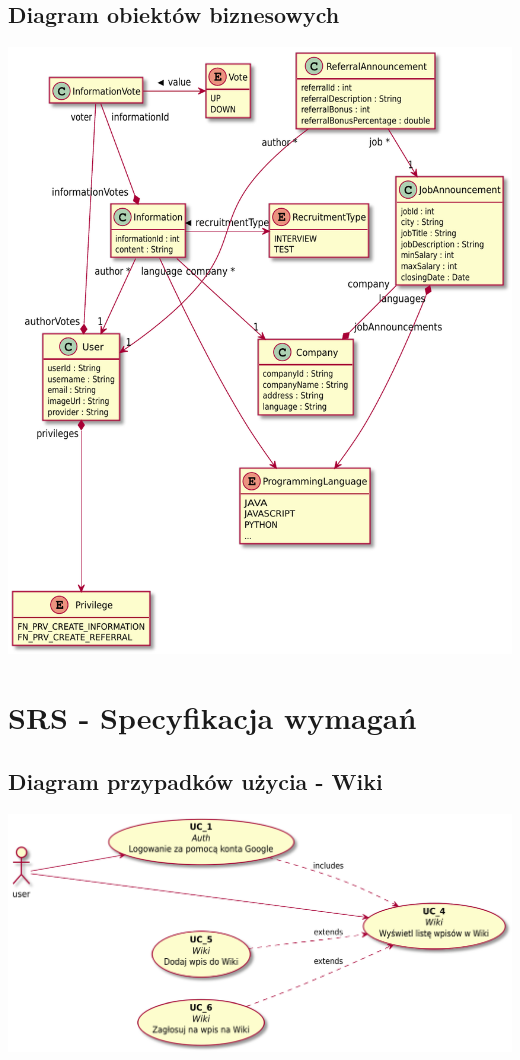\documentclass[oneside]{scrreprt}
\begin{document}
\section{Diagram obiektów biznesowych}
\includegraphics[width=\textwidth, keepaspectratio]{graphics/hydra_business_class_diagram.pdf}

\chapter{SRS - Specyfikacja wymagań}
\section{Diagram przypadków użycia - Wiki}
\includegraphics[width=\textwidth, keepaspectratio]{graphics/wiki_use_case_diagram.pdf}
\end{document}

